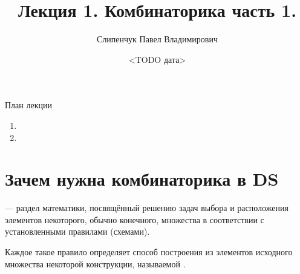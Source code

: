 
  

\title{Лекция 1. Комбинаторика часть 1.}
\date{<TODO дата>}
\author{Слипенчук Павел Владимирович}



  \maketitle
    
  \begin{frame}{План лекции}\label{frame:plan}
    \begin{enumerate}
	\item {}
	\item {}
	\end{enumerate}
 \end{frame}
    
\section{Зачем нужна комбинаторика в DS}\label{section:why_combinatorics}
\begin{frame}
 — раздел математики, посвящённый 
решению задач выбора и расположения элементов некоторого, обычно конечного, множества
в соответствии с установленными правилами (схемами). 

Каждое такое правило определяет способ построения из элементов исходного множества некоторой конструкции, 
называемой . 
\end{frame}


